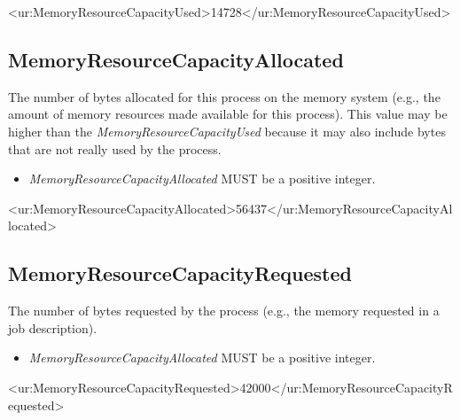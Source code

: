\begin{XMLexample}
<ur:MemoryResourceCapacityUsed>14728</ur:MemoryResourceCapacityUsed> 
\end{XMLexample}






\subsection{MemoryResourceCapacityAllocated}

The number of bytes allocated for this process on the memory system (e.g., the amount of memory resources made available for this process). This value may be higher than the \emph{MemoryResourceCapacityUsed} because it may also include bytes that are not really used by the process.

\begin{itemize}
\item \emph{MemoryResourceCapacityAllocated} MUST be a positive integer.
\end{itemize}

\begin{XMLexample}
<ur:MemoryResourceCapacityAllocated>56437</ur:MemoryResourceCapacityAllocated> 
\end{XMLexample}






\subsection{MemoryResourceCapacityRequested}

The number of bytes requested by the process (e.g., the memory requested in a job description).

\begin{itemize}
\item \emph{Memory\-Resource\-Capacity\-Allocated} MUST be a positive integer.
\end{itemize}

\begin{XMLexample}
<ur:MemoryResourceCapacityRequested>42000</ur:MemoryResourceCapacityRequested>
\end{XMLexample}






